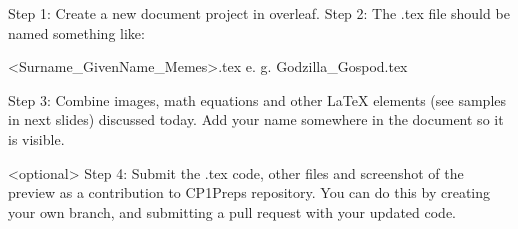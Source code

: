 Step 1: Create a new document project in overleaf. 
Step 2: The .tex file should be named something like:

<Surname_GivenName_Memes>.tex       e. g. Godzilla_Gospod.tex

Step 3: Combine images, math equations and other LaTeX elements (see samples in next slides) discussed today. Add your name somewhere in the document so it is visible. 

<optional> 
Step 4: Submit the .tex code, other files and screenshot of the preview as a contribution to CP1Preps repository. You can do this by creating your own branch, and submitting a pull request with your updated code. 
